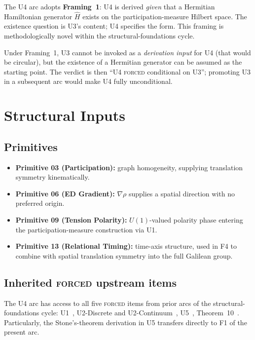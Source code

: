 \documentclass[11pt,a4paper]{article}
\begin{document}
The U4 arc adopts \textbf{Framing~1}: U4 is derived \emph{given} that a Hermitian Hamiltonian generator $\hat{H}$ exists on the participation-measure Hilbert space. The existence question is U3's content; U4 specifies the form. This framing is methodologically novel within the structural-foundations cycle.

Under Framing~1, U3 cannot be invoked as a \emph{derivation input} for U4 (that would be circular), but the existence of a Hermitian generator can be assumed as the starting point. The verdict is then ``U4 \textsc{forced} conditional on U3''; promoting U3 in a subsequent arc would make U4 fully unconditional.

\section{Structural Inputs}\label{sec:inputs}

\subsection{Primitives}

\begin{itemize}
  \item \textbf{Primitive 03 (Participation):} graph homogeneity, supplying translation symmetry kinematically.
  \item \textbf{Primitive 06 (ED Gradient):} $\nabla \rho$ supplies a spatial direction with no preferred origin.
  \item \textbf{Primitive 09 (Tension Polarity):} $U(1)$-valued polarity phase entering the participation-measure construction via U1.
  \item \textbf{Primitive 13 (Relational Timing):} time-axis structure, used in F4 to combine with spatial translation symmetry into the full Galilean group.
\end{itemize}

\subsection{Inherited \textsc{forced} upstream items}

The U4 arc has access to all five \textsc{forced} items from prior arcs of the structural-foundations cycle: U1~\cite{u1}, U2-Discrete and U2-Continuum~\cite{u2}, U5~\cite{u5}, Theorem~10~\cite{borngleason}. Particularly, the Stone's-theorem derivation in U5 transfers directly to F1 of the present arc.
\end{document}
